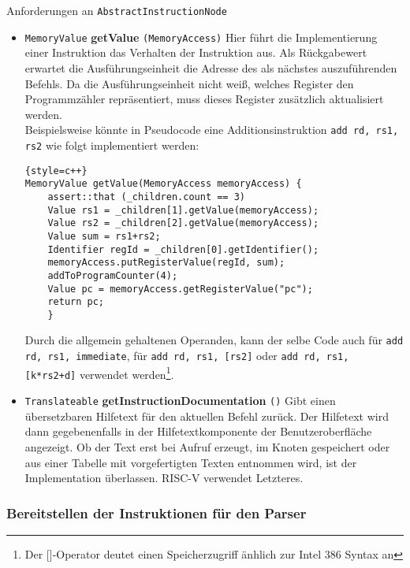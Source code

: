Anforderungen an \texttt{AbstractInstructionNode}

\begin{itemize}

  \item \texttt{MemoryValue} \textbf{getValue} \texttt{(MemoryAccess)} Hier
  führt die Implementierung einer Instruktion das Verhalten der Instruktion aus.
  Als Rückgabewert erwartet die Ausführungseinheit die Adresse des als nächstes
  auszuführenden Befehls. Da die Ausführungseinheit nicht weiß, welches Register
  den Programmzähler repräsentiert, muss dieses Register zusätzlich aktualisiert
  werden. \\ Beispielsweise könnte in Pseudocode eine Additionsinstruktion
  \texttt{add rd, rs1, rs2} wie folgt implementiert werden:

\begin{lstlisting}{style=c++}
MemoryValue getValue(MemoryAccess memoryAccess) {
	assert::that (_children.count == 3)
	Value rs1 = _children[1].getValue(memoryAccess);
	Value rs2 = _children[2].getValue(memoryAccess);
	Value sum = rs1+rs2;
	Identifier regId = _children[0].getIdentifier();
	memoryAccess.putRegisterValue(regId, sum);
	addToProgramCounter(4);
	Value pc = memoryAccess.getRegisterValue("pc");
	return pc;
	}
\end{lstlisting}

	Durch die allgemein gehaltenen Operanden, kann der selbe Code auch für
	\texttt{add rd, rs1, immediate}, für \texttt{add rd, rs1, [rs2]} oder
	\texttt{add rd, rs1, [k*rs2+d]} verwendet werden\footnote{Der []-Operator
	deutet einen Speicherzugriff änhlich zur Intel 386 Syntax an}.

  \item \texttt{Translateable} \textbf{getInstructionDocumentation} \texttt{()}
  Gibt einen übersetzbaren Hilfetext für den aktuellen Befehl zurück. Der
  Hilfetext wird dann gegebenenfalls in der Hilfetextkomponente der
  Benutzeroberfläche angezeigt. Ob der Text erst bei Aufruf erzeugt, im Knoten
  gespeichert oder aus einer Tabelle mit vorgefertigten Texten entnommen wird,
  ist der Implementation überlassen. RISC-V verwendet Letzteres.

\end{itemize}

\subsubsection{Bereitstellen der Instruktionen für den Parser}
\label{extension-arch-factories}

